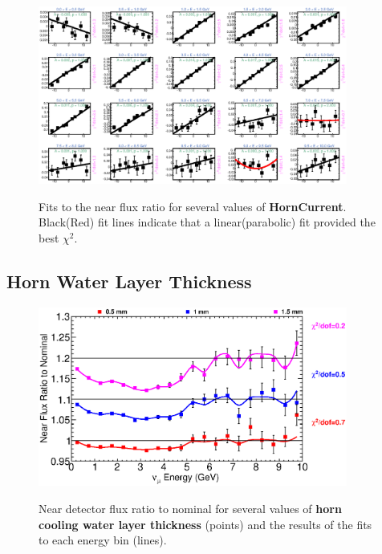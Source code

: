 \begin{figure}[hb]
  \begin{center}
    {\includegraphics[width=4.0in]{figures/HornCurrent_near_fits.eps}}
  \end{center}
\caption{ Fits to the near flux ratio for several values of {\bf HornCurrent}. Black(Red) fit lines indicate that a linear(parabolic) fit provided the best $\chi^2$. }
\end{figure}

\clearpage
\subsection{Horn Water Layer Thickness}

\begin{figure}[ht]
  \begin{center}
    {\includegraphics[width=4.0in]{figures/NominalWaterLayer__near_summary.eps}}
  \end{center}
\caption{ Near detector flux ratio to nominal for several values of {\bf horn cooling water layer thickness} (points) and the results of the fits to each energy bin (lines).}
\end{figure}

